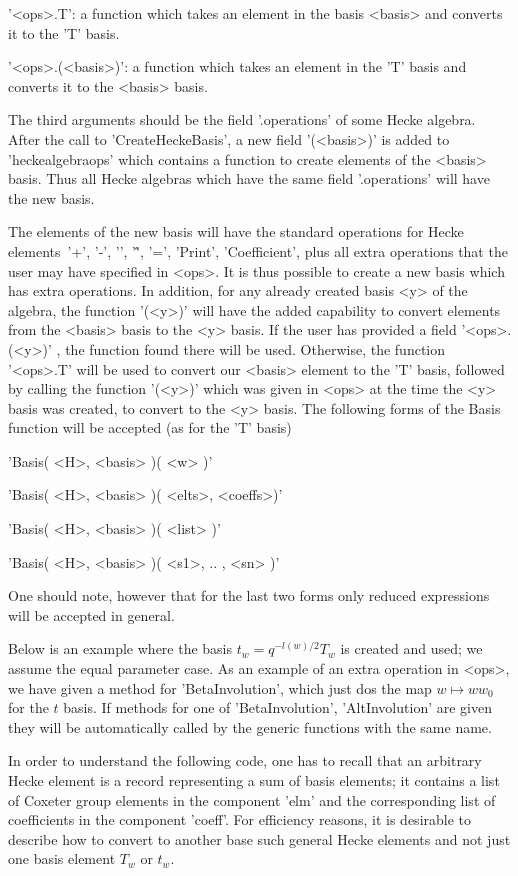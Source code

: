  '<ops>.T': a  function which takes  an element in  the basis <basis> and
  converts it to the 'T' basis.

 '<ops>.(<basis>)': a function  which takes an element  in the  'T' basis
  and converts it to the <basis> basis.

The  third arguments  should be  the field  '.operations' of  some Hecke
algebra. After the  call to 'CreateHeckeBasis', a  new field '(<basis>)'
is  added  to 'heckealgebraops'  which  contains  a function  to  create
elements of  the <basis> basis. Thus  all Hecke algebras which  have the
same field '.operations' will have the new basis.

The elements  of the  new basis  will have  the standard  operations for
Hecke  elements\:\ '+',  '-', '\*',  '\^', '=',  'Print', 'Coefficient',
plus all extra operations that the  user may have specified in <ops>. It
is thus  possible to create a  new basis which has  extra operations. In
addition, for any already created basis <y> of the algebra, the function
'(<y>)'  will have  the added  capability to  convert elements  from the
<basis>  basis to  the  <y> basis.  If  the user  has  provided a  field
'<ops>.(<y>)' ,  the function found  there will be used.  Otherwise, the
function '<ops>.T'  will be used to  convert our <basis> element  to the
'T' basis, followed  by calling the function '(<y>)' which  was given in
<ops> at  the time  the <y>  basis was  created, to  convert to  the <y>
basis. The  following forms of the  Basis function will be  accepted (as
for the 'T' basis)\:

'Basis( <H>, <basis> )( <w> )'

'Basis( <H>, <basis> )( <elts>, <coeffs>)'

'Basis( <H>, <basis> )( <list> )'

'Basis( <H>, <basis> )( <s1>, .. , <sn> )'

One   should note,  however  that  for the  last  two forms  only reduced
expressions will be accepted in general.

Below  is an  example where  the basis  $t_w=q^{-l(w)/2}T_w$ is created and
used;  we  assume  the  equal  parameter  case.  As  an example of an extra
operation in <ops>, we have given a method for 'BetaInvolution', which just
dos  the map  $w\mapsto w  w_0$ for  the $t$  basis. If  methods for one of
'BetaInvolution',  'AltInvolution'  are  given  they  will be automatically
called by the generic functions with the same name.

In  order  to  understand  the  following  code,  one has to recall that an
arbitrary  Hecke element is a record  representing a sum of basis elements;
it contains a list of Coxeter group elements in the component 'elm' and the
corresponding list of coefficients in the component 'coeff'. For efficiency
reasons,  it is desirable to  describe how to convert  to another base such
general Hecke elements and not just one basis element $T_w$ or $t_w$.

